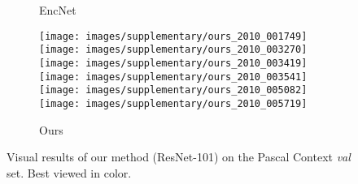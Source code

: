 \documentclass[10pt,twocolumn,letterpaper]{article}
\begin{document}
\begin{figure*}[!htb]
\begin{center}
\begin{subfigure}[b]{0.24\linewidth}
		\caption{EncNet}
    \end{subfigure}
    \hfill
	\begin{subfigure}[b]{0.24\linewidth}
		\texttt{[image: images/supplementary/ours\_2010\_001749]}\\
		\texttt{[image: images/supplementary/ours\_2010\_003270]}\\
		\texttt{[image: images/supplementary/ours\_2010\_003419]}\\
		\texttt{[image: images/supplementary/ours\_2010\_003541]}\\
		\texttt{[image: images/supplementary/ours\_2010\_005082]}\\
		\texttt{[image: images/supplementary/ours\_2010\_005719]}\\
		\caption{Ours}
    \end{subfigure}
\end{center}
	\caption{Visual results of our method (ResNet-101) on the Pascal Context \textit{val} set. Best viewed in color.}
\end{figure*}
\end{document}
